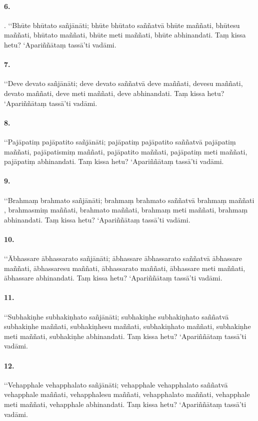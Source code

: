 \paragraph{6.} . ‘‘Bhūte bhūtato sañjānāti; bhūte bhūtato saññatvā bhūte maññati, bhūtesu maññati, bhūtato maññati, bhūte meti maññati, bhūte abhinandati. Taṃ kissa hetu? ‘Apariññātaṃ tassā’ti vadāmi.

\paragraph{7.} ‘‘Deve devato sañjānāti; deve devato saññatvā deve maññati, devesu maññati, devato maññati, deve meti maññati, deve abhinandati. Taṃ kissa hetu? ‘Apariññātaṃ tassā’ti vadāmi.

\paragraph{8.} ‘‘Pajāpatiṃ pajāpatito sañjānāti; pajāpatiṃ pajāpatito saññatvā pajāpatiṃ maññati, pajāpatismiṃ maññati, pajāpatito maññati, pajāpatiṃ meti maññati, pajāpatiṃ abhinandati. Taṃ kissa hetu? ‘Apariññātaṃ tassā’ti vadāmi.

\paragraph{9.} ‘‘Brahmaṃ brahmato sañjānāti; brahmaṃ brahmato saññatvā brahmaṃ maññati , brahmasmiṃ maññati, brahmato maññati, brahmaṃ meti maññati, brahmaṃ abhinandati. Taṃ kissa hetu? ‘Apariññātaṃ tassā’ti vadāmi.

\paragraph{10.} ‘‘Ābhassare ābhassarato sañjānāti; ābhassare ābhassarato saññatvā ābhassare maññati, ābhassaresu maññati, ābhassarato maññati, ābhassare meti maññati, ābhassare abhinandati. Taṃ kissa hetu? ‘Apariññātaṃ tassā’ti vadāmi.

\paragraph{11.} ‘‘Subhakiṇhe subhakiṇhato sañjānāti; subhakiṇhe subhakiṇhato saññatvā subhakiṇhe maññati, subhakiṇhesu maññati, subhakiṇhato maññati, subhakiṇhe meti maññati, subhakiṇhe abhinandati. Taṃ kissa hetu? ‘Apariññātaṃ tassā’ti vadāmi.

\paragraph{12.} ‘‘Vehapphale vehapphalato sañjānāti; vehapphale vehapphalato saññatvā vehapphale maññati, vehapphalesu maññati, vehapphalato maññati, vehapphale meti maññati, vehapphale abhinandati. Taṃ kissa hetu? ‘Apariññātaṃ tassā’ti vadāmi.

